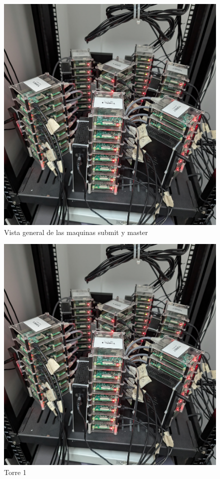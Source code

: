 \begin{figure}[H]
	\centering
	\includegraphics[scale=0.07]{tablas-images/raspberries/torre-binaria.jpg}
	\caption{Vista general de las maquinas submit y master}
	\label{fig:foto-torre-binaria}
\end{figure}




\begin{figure}[H]
	\centering
	\includegraphics[scale=0.07]{tablas-images/raspberries/torre-01.jpg}
	\caption{Torre 1}
\end{figure}

